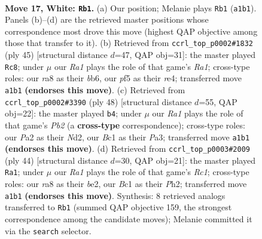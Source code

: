 \documentclass[11pt]{article}
\begin{document}
\clearpage

\begin{figure}[p]\centering
\begin{subfigure}{0.46\textwidth}\centering
\resizebox{\linewidth}{!}{%
\newchessgame
\chessboard[
  setfen={rnb3k1/1p6/6p1/p1p2p1p/2P5/2P5/P4PPP/R1BB2K1 w - - 0 17},
  showmover=false,
  pgfstyle=straightmove, color=movearrow, markmove={a1-b1}
]}
\caption{}
\end{subfigure}\hfill
\begin{subfigure}{0.46\textwidth}\centering
\resizebox{\linewidth}{!}{%
\newchessgame
\chessboard[
  setfen={r4bk1/1p1b2pp/pB3p2/8/1P2R3/P4N1P/2P2PP1/6K1 b - - 0 23},
  showmover=false,
  pgfstyle=straightmove, color=movearrow, markmove={a8-c8}
]}
\caption{}
\end{subfigure}
\\[4pt]
\begin{subfigure}{0.46\textwidth}\centering
\resizebox{\linewidth}{!}{%
\newchessgame
\chessboard[
  setfen={2b3k1/3n2p1/p3pp1p/1p6/5P2/P3P1P1/1P1NBKP1/8 w - - 0 25},
  showmover=false,
  pgfstyle=straightmove, color=movearrow, markmove={b2-b4}
]}
\caption{}
\end{subfigure}\hfill
\begin{subfigure}{0.46\textwidth}\centering
\resizebox{\linewidth}{!}{%
\newchessgame
\chessboard[
  setfen={r5k1/p4pp1/2p1p2p/2p5/4P3/2B5/P1P1bPPP/2R3K1 w - - 0 23},
  showmover=false,
  pgfstyle=straightmove, color=movearrow, markmove={c1-a1}
]}
\caption{}
\end{subfigure}
\caption{\textbf{Move 17, White: \texttt{Rb1}.} (a) Our position; Melanie plays \texttt{Rb1} (\texttt{a1b1}). Panels (b)--(d) are the retrieved master positions whose correspondence most drove this move (highest QAP objective among those that transfer to it). (b) Retrieved from \texttt{ccrl\_top\_p0002\#1832} (ply 45) [structural distance $d$=47, QAP obj=31]: the master played \texttt{Rc8}; under $\mu$ our \emph{Ra1} plays the role of that game's \emph{Ra1}; cross-type roles: our \emph{r}a8 as their \emph{b}b6, our \emph{p}f5 as their \emph{r}e4; transferred move \texttt{a1b1} \textbf{(endorses this move)}. (c) Retrieved from \texttt{ccrl\_top\_p0002\#3390} (ply 48) [structural distance $d$=55, QAP obj=22]: the master played \texttt{b4}; under $\mu$ our \emph{Ra1} plays the role of that game's \emph{Pb2} (a \textbf{cross-type} correspondence); cross-type roles: our \emph{P}a2 as their \emph{N}d2, our \emph{B}c1 as their \emph{P}a3; transferred move \texttt{a1b1} \textbf{(endorses this move)}. (d) Retrieved from \texttt{ccrl\_top\_p0003\#2009} (ply 44) [structural distance $d$=30, QAP obj=21]: the master played \texttt{Ra1}; under $\mu$ our \emph{Ra1} plays the role of that game's \emph{Rc1}; cross-type roles: our \emph{r}a8 as their \emph{b}e2, our \emph{B}c1 as their \emph{P}h2; transferred move \texttt{a1b1} \textbf{(endorses this move)}. Synthesis: 8 retrieved analogs transferred to \texttt{Rb1} (summed QAP objective 159, the strongest correspondence among the candidate moves); Melanie committed it via the \texttt{search} selector.}
\label{fig:thought-m32}
\end{figure}
\end{document}
